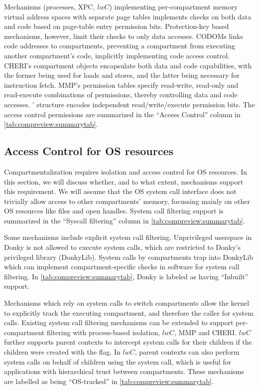 Mechanisms (processes, XPC, $lwC$) implementing per-compartment memory 
virtual address spaces with separate page tables implements checks on both 
data and code based on page-table entry permission bits.
Protection-key based mechanisms, however, limit their checks to only
data accesses.
CODOMs links code addresses to compartments, preventing a compartment from
executing another compartment's code, implicitly implementing code
access control.
CHERI's compartment objects encapsulate both data and code capabilities,
with the former being used for loads and stores, and the latter being 
necessary for instruction fetch.
MMP's permission tables specify read-write, read-only and read-execute
combinations of permissions, thereby controlling data and code accesses.
\seccells' \ptable structure encodes independent read/write/execute
permission bits.
The access control permissions are summarized in the ``Access Control''
column in \autoref{tab:compreview:summarytab}.

\subsection{Access Control for OS resources}
Compartmentalization requires isolation and access control for OS resources.
In this section, we will discuss whether, and to what extent, mechanisms 
support this requirement.
We will assume that the OS system call interface does not trivially allow
access to other compartments' memory, focussing mainly on other OS resources
like files and open handles.
System call filtering support is summarized in the ``Syscall filtering''
column in \autoref{tab:compreview:summarytab}.

Some mechanisms include explicit system call filtering.
Unprivileged userspace in Donky is not allowed to execute system calls,
which are restricted to Donky's privileged library (DonkyLib).
System calls by compartments trap into DonkyLib which can implement
compartment-specific checks in software for system call filtering.
In \autoref{tab:compreview:summarytab}, Donky is labeled as having ``Inbuilt''
support.

Mechanisms which rely on system calls to switch compartments allow
the kernel to explicitly track the executing compartment, and therefore
the caller for system calls.
Existing system call filtering mechanisms can be extended to support
per-compartment filtering with process-based isolation, $lwC$, MMP and
CHERI.
$lwC$ further supports parent contexts to intercept system calls for
their children if the children were created with the 
flag. 
In $lwC$, parent contexts can also perform system calls on behalf of 
children using the  system call, which is useful for
applications with hierarchical trust between compartments.
These mechanisms are labelled as being ``OS-tracked'' in 
\autoref{tab:compreview:summarytab}.

